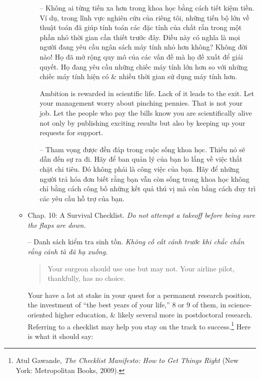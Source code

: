 \documentclass{article}
\begin{document}
\begin{enumerate}
\begin{itemize}
\begin{itemize}
			-- Không ai từng tiến xa hơn trong khoa học bằng cách tiết kiệm tiền. Ví dụ, trong lĩnh vực nghiên cứu của riêng tôi, những tiến bộ lớn về thuật toán đã giúp tính toán các đặc tính của chất rắn trong một phần nhỏ thời gian cần thiết trước đây. Điều này có nghĩa là mọi người đang yêu cầu ngân sách máy tính nhỏ hơn không? Không đời nào! Họ đã mở rộng quy mô của các vấn đề mà họ đề xuất để giải quyết. Họ đang yêu cầu những chiếc máy tính lớn hơn so với những chiếc máy tính hiện có \& nhiều thời gian sử dụng máy tính hơn.
			
			Ambition is rewarded in scientific life. Lack of it leads to the exit. Let your management worry about pinching pennies. That is not your job. Let the people who pay the bills know you are scientifically alive not only by publishing exciting results but also by keeping up your requests for support.
			
			-- Tham vọng được đền đáp trong cuộc sống khoa học. Thiếu nó sẽ dẫn đến sự ra đi. Hãy để ban quản lý của bạn lo lắng về việc thắt chặt chi tiêu. Đó không phải là công việc của bạn. Hãy để những người trả hóa đơn biết rằng bạn vẫn còn sống trong khoa học không chỉ bằng cách công bố những kết quả thú vị mà còn bằng cách duy trì các yêu cầu hỗ trợ của bạn.
		\end{itemize}
		
		\item {\sf Chap. 10: A Survival Checklist.} {\it Do not attempt a takeoff before being sure the flaps are down.}
		
		-- {\sf Danh sách kiểm tra sinh tồn.} {\it Không cố cất cánh trước khi chắc chắn rằng cánh tà đã hạ xuống.}
		\begin{quote}
			Your surgeon should use one but may not. Your airline pilot, thankfully, has no choice.
		\end{quote}
		Your have a lot at stake in your quest for a permanent research position, the investment of ``the best years of your life,'' 8 or 9 of them, in science-oriented higher education, \& likely several more in postdoctoral research. Referring to a checklist may help you stay on the track to success.\footnote{{\sc Atul Gawande}, {\it The Checklist Manifesto: How to Get Things Right} (New York: Metropolitan Books, 2009).} Here is what it should say:
		

\end{itemize}
\end{enumerate}
\end{document}
